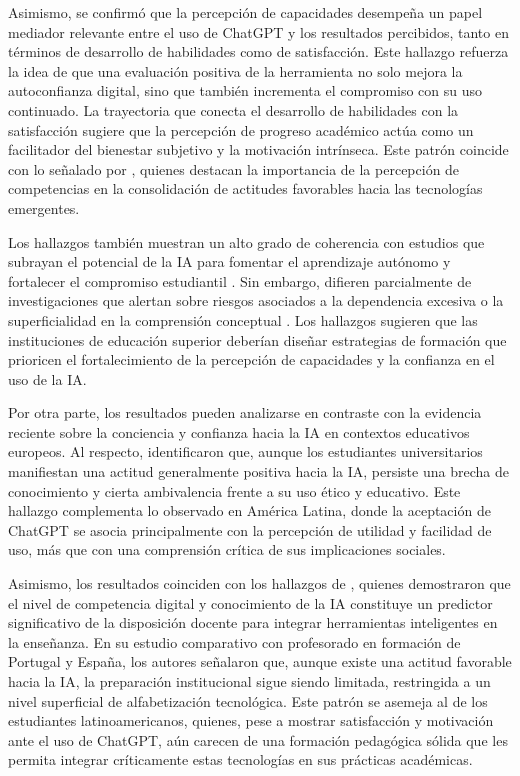 \documentclass[spanish]{textolivre}
\begin{document}
Asimismo, se confirmó que la percepción de capacidades desempeña un papel mediador relevante entre el uso de ChatGPT y los resultados percibidos, tanto en términos de desarrollo de habilidades como de satisfacción. Este hallazgo refuerza la idea de que una evaluación positiva de la herramienta no solo mejora la autoconfianza digital, sino que también incrementa el compromiso con su uso continuado. La trayectoria que conecta el desarrollo de habilidades con la satisfacción sugiere que la percepción de progreso académico actúa como un facilitador del bienestar subjetivo y la motivación intrínseca. Este patrón coincide con lo señalado por \textcite{rahman2023}, quienes destacan la importancia de la percepción de competencias en la consolidación de actitudes favorables hacia las tecnologías emergentes.

Los hallazgos también muestran un alto grado de coherencia con estudios que subrayan el potencial de la IA para fomentar el aprendizaje autónomo y fortalecer el compromiso estudiantil \cite{wang2023}. Sin embargo, difieren parcialmente de investigaciones que alertan sobre riesgos asociados a la dependencia excesiva o la superficialidad en la comprensión conceptual \cite{yankouskaya2025, cao2025}. Los hallazgos sugieren que las instituciones de educación superior deberían diseñar estrategias de formación que prioricen el fortalecimiento de la percepción de capacidades y la confianza en el uso de la IA.

Por otra parte, los resultados pueden analizarse en contraste con la evidencia reciente sobre la conciencia y confianza hacia la IA en contextos educativos europeos. Al respecto, \textcite{arroyosagasta2025} identificaron que, aunque los estudiantes universitarios manifiestan una actitud generalmente positiva hacia la IA, persiste una brecha de conocimiento y cierta ambivalencia frente a su uso ético y educativo. Este hallazgo complementa lo observado en América Latina, donde la aceptación de ChatGPT se asocia principalmente con la percepción de utilidad y facilidad de uso, más que con una comprensión crítica de sus implicaciones sociales.

Asimismo, los resultados coinciden con los hallazgos de \textcite{lucas2025}, quienes demostraron que el nivel de competencia digital y conocimiento de la IA constituye un predictor significativo de la disposición docente para integrar herramientas inteligentes en la enseñanza. En su estudio comparativo con profesorado en formación de Portugal y España, los autores señalaron que, aunque existe una actitud favorable hacia la IA, la preparación institucional sigue siendo limitada, restringida a un nivel superficial de alfabetización tecnológica. Este patrón se asemeja al de los estudiantes latinoamericanos, quienes, pese a mostrar satisfacción y motivación ante el uso de ChatGPT, aún carecen de una formación pedagógica sólida que les permita integrar críticamente estas tecnologías en sus prácticas académicas.
\end{document}
